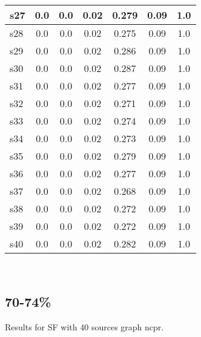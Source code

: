 \documentclass{article}
\begin{document}
\begin{tabular}{|l|c|c|c|c|c|c|}
\hline
s27 &0.0 & 0.0 & 0.02 & 0.279 & 0.09 & 1.0\\
\hline
s28 &0.0 & 0.0 & 0.02 & 0.275 & 0.09 & 1.0\\
\hline
s29 &0.0 & 0.0 & 0.02 & 0.286 & 0.09 & 1.0\\
\hline
s30 &0.0 & 0.0 & 0.02 & 0.287 & 0.09 & 1.0\\
\hline
s31 &0.0 & 0.0 & 0.02 & 0.277 & 0.09 & 1.0\\
\hline
s32 &0.0 & 0.0 & 0.02 & 0.271 & 0.09 & 1.0\\
\hline
s33 &0.0 & 0.0 & 0.02 & 0.274 & 0.09 & 1.0\\
\hline
s34 &0.0 & 0.0 & 0.02 & 0.273 & 0.09 & 1.0\\
\hline
s35 &0.0 & 0.0 & 0.02 & 0.279 & 0.09 & 1.0\\
\hline
s36 &0.0 & 0.0 & 0.02 & 0.277 & 0.09 & 1.0\\
\hline
s37 &0.0 & 0.0 & 0.02 & 0.268 & 0.09 & 1.0\\
\hline
s38 &0.0 & 0.0 & 0.02 & 0.272 & 0.09 & 1.0\\
\hline
s39 &0.0 & 0.0 & 0.02 & 0.272 & 0.09 & 1.0\\
\hline
s40 &0.0 & 0.0 & 0.02 & 0.282 & 0.09 & 1.0\\
\hline
\end{tabular}\\

\newpage

\subsection{70-74\%}

\noindent Results for SF with 40 sources graph ncpr.
\end{document}
